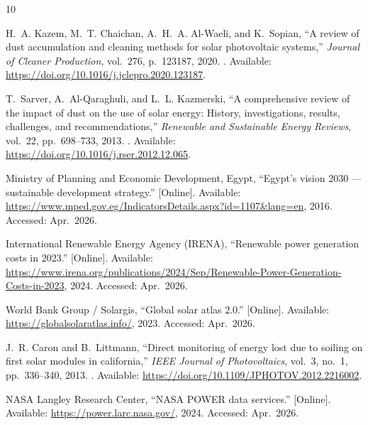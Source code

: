 \documentclass[12pt,a4paper]{report}   %
\begin{document}
% 
% 
\begin{thebibliography}{10}

H.~A. Kazem, M.~T. Chaichan, A.~H.~A. Al-Waeli, and K.~Sopian, ``A review of
  dust accumulation and cleaning methods for solar photovoltaic systems,'' {\em
  Journal of Cleaner Production}, vol.~276, p.~123187, 2020.
\newblock [Online]. Available:
  \url{https://doi.org/10.1016/j.jclepro.2020.123187}.

T.~Sarver, A.~Al-Qaraghuli, and L.~L. Kazmerski, ``A comprehensive review of
  the impact of dust on the use of solar energy: History, investigations,
  results, challenges, and recommendations,'' {\em Renewable and Sustainable
  Energy Reviews}, vol.~22, pp.~698--733, 2013.
\newblock [Online]. Available:
  \url{https://doi.org/10.1016/j.rser.2012.12.065}.

{Ministry of Planning and Economic Development, Egypt}, ``Egypt's vision 2030
  --- sustainable development strategy.'' [Online]. Available:
  \url{https://www.mped.gov.eg/IndicatorsDetails.aspx?id=1107&lang=en}, 2016.
\newblock Accessed: Apr.\ 2026.

{International Renewable Energy Agency (IRENA)}, ``Renewable power generation
  costs in 2023.'' [Online]. Available:
  \url{https://www.irena.org/publications/2024/Sep/Renewable-Power-Generation-Costs-in-2023},
  2024.
\newblock Accessed: Apr.\ 2026.

{World Bank Group / Solargis}, ``Global solar atlas 2.0.'' [Online]. Available:
  \url{https://globalsolaratlas.info/}, 2023.
\newblock Accessed: Apr.\ 2026.

J.~R. Caron and B.~Littmann, ``Direct monitoring of energy lost due to soiling
  on first solar modules in california,'' {\em {IEEE} Journal of
  Photovoltaics}, vol.~3, no.~1, pp.~336--340, 2013.
\newblock [Online]. Available:
  \url{https://doi.org/10.1109/JPHOTOV.2012.2216002}.

{NASA Langley Research Center}, ``{NASA POWER} data services.'' [Online].
  Available: \url{https://power.larc.nasa.gov/}, 2024.
\newblock Accessed: Apr.\ 2026.


\end{thebibliography}
\end{document}
